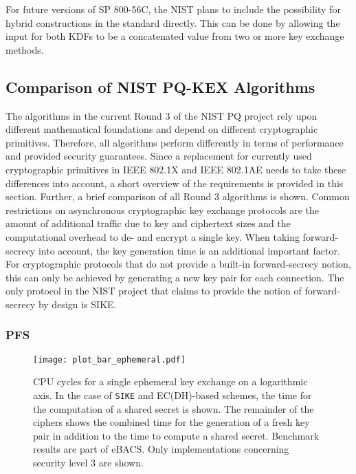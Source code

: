 For future versions of SP 800-56C, the \ac{NIST} plans to include the possibility for hybrid constructions in the standard directly. This can be done by allowing the input for both \acp{KDF} to be a concatenated value from two or more key exchange methods.

\subsection{Comparison of NIST PQ-KEX Algorithms}
The algorithms in the current Round 3 of the \ac{NIST} \ac{PQ} project rely upon different mathematical foundations and depend on different cryptographic primitives. Therefore, all algorithms perform differently in terms of performance and provided security guarantees. Since a replacement for currently used cryptographic primitives in IEEE 802.1X and IEEE 802.1AE needs to take these differences into account, a short overview of the requirements is provided in this section. Further, a brief comparison of all Round 3 algorithms is shown. Common restrictions on asynchronous cryptographic key exchange protocols are the amount of additional traffic due to key and ciphertext sizes and the computational overhead to de- and encrypt a single key. When taking forward-secrecy into account, the key generation time is an additional important factor. For cryptographic protocols that do not provide a built-in forward-secrecy notion, this can only be achieved by generating a new key pair for each connection. The only protocol in the \ac{NIST} project that claims to provide the notion of forward-secrecy by design is SIKE.

\subsubsection{\acf{PFS}}

\begin{figure}[ht]
    \centering\texttt{[image: plot\_bar\_ephemeral.pdf]}
    \caption{CPU cycles for a single ephemeral key exchange on a logarithmic axis. In the case of \texttt{SIKE} and EC(DH)-based schemes, the time for the computation of a shared secret is shown. The remainder of the ciphers shows the combined time for the generation of a fresh key pair in addition to the time to compute a shared secret. Benchmark results are part of eBACS\cite{eBACS}. Only implementations concerning security level 3 are shown.}\label{fig:ephemeral}
\end{figure}


